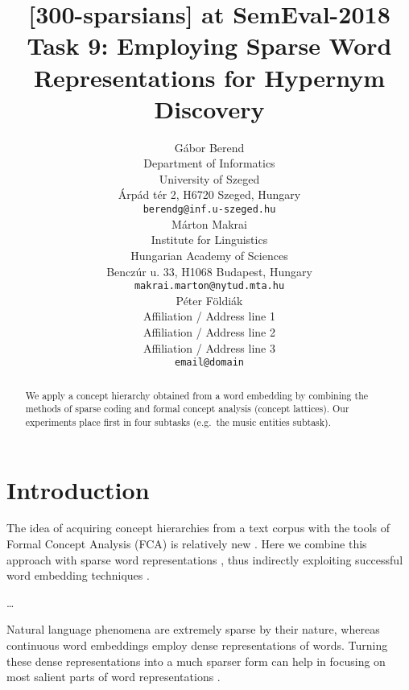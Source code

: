\documentclass[11pt,a4paper]{article}
\title{[300-sparsians] at SemEval-2018 Task 9: Employing Sparse Word Representations for Hypernym Discovery}
\author{Gábor Berend \\
Department of Informatics \\ University of Szeged \\
Árpád tér 2, H6720 Szeged, Hungary \\
{\tt berendg@inf.u-szeged.hu} \\\And
  Márton Makrai  \\ %
  Institute for Linguistics \\
  Hungarian Academy of Sciences \\
  Benczúr u. 33, H1068 Budapest, Hungary \\
  {\tt makrai.marton@nytud.mta.hu} \\\AND
  Péter Földiák \\
  Affiliation / Address line 1 \\
  Affiliation / Address line 2 \\
  Affiliation / Address line 3 \\
  {\tt email@domain} \\}
\date{}
\begin{document}
\maketitle

\vspace{1cm}

\begin{abstract}
  We apply a concept hierarchy obtained from a word embedding by combining the
  methods of sparse coding and formal concept analysis (concept lattices).
  Our experiments place first in four subtasks (e.g.~the music entities
  subtask).
\end{abstract}

\section{Introduction}

The idea of acquiring concept hierarchies from a text corpus with the tools of
Formal Concept Analysis (FCA) is relatively new \citep{Cimiano:2005}. Here we
combine this approach with sparse word representations \citep{Faruqui:2015},
thus indirectly exploiting successful word embedding techniques
\citep{Mikolov:2013d}.

\dots %

Natural language phenomena are extremely sparse by their nature, whereas
continuous word embeddings employ dense representations of words. Turning
these dense representations into a much sparser form can help in focusing on
most salient parts of word representations \citep{Faruqui:2015,Berend:2016}.

\newcommand{\abconc}{$\langle A, B\rangle$}
\end{document}
